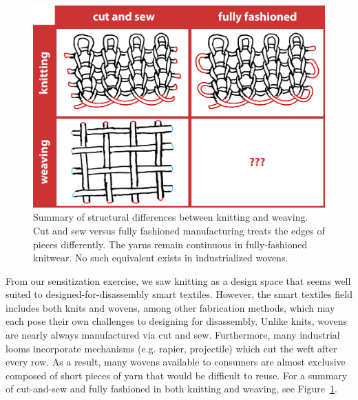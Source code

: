 \begin{figure}
    \centering
    \includegraphics[width=\linewidth]{figs/UF_knitweave_cutff.png}
    \caption[Structural differences between knitting and weaving.]{Summary of structural differences between knitting and weaving. Cut and sew versus fully fashioned manufacturing treats the edges of pieces differently. The yarns remain continuous in fully-fashioned knitwear. No such equivalent exists in industrialized wovens.}
    \label{fig:cutcont_knitweave}
\end{figure}

From our sensitization exercise, we saw knitting as a design space that seems well suited to designed-for-disassembly smart textiles. However, the smart textiles field includes both knits and wovens, among other fabrication methods, which may each pose their own challenges to designing for disassembly. 
Unlike knits, wovens are nearly always manufactured via cut and sew. Furthermore, many industrial looms incorporate mechanisms (e.g. rapier, projectile) which cut the weft after every row. As a result, many wovens available to consumers are almost exclusive composed of short pieces of yarn that would be difficult to reuse. For a summary of cut-and-sew and fully fashioned in both knitting and weaving, see Figure~\ref{fig:cutcont_knitweave}.

